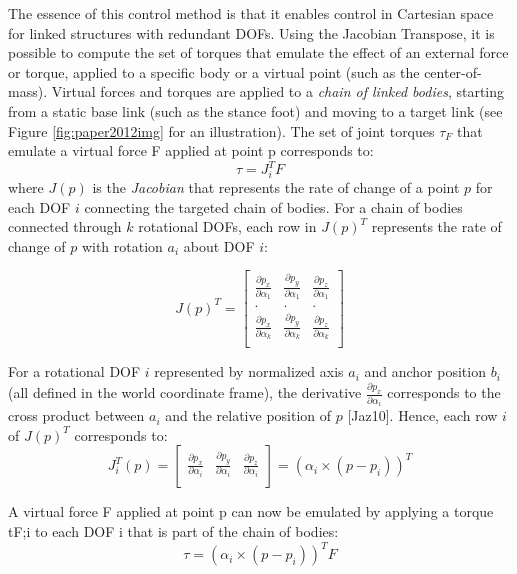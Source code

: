 \documentclass[runningheads,a4paper,10pt]{llncs}
\begin{document}
The essence of this control method is that it enables control in Cartesian space for linked structures with redundant DOFs. Using the Jacobian Transpose, it is possible to compute the set of torques that emulate the effect of an external force or torque, applied to a specific body or a virtual point (such as the center-of-mass). Virtual forces and torques are applied to a \textit{chain of linked bodies}, starting from a static base link (such as the stance foot) and moving to a target link (see Figure \ref{fig:paper2012img} for an illustration). The set of joint torques $\tau _F$ that emulate a virtual force F applied at point p corresponds to:
\begin{equation}
\tau=J_i^T F
\end{equation}
where $J(p)$ is the \textit{Jacobian} that represents the rate of change of a point $p$ for each DOF $i$ connecting the targeted chain of bodies. For a chain of bodies connected through $k$ rotational DOFs, each row in $J(p)^T$ represents the rate of change of $p$ with rotation $a_i$ about DOF $i$:

\begin{equation}
J(p)^T =\begin{bmatrix}
\frac{\partial p_x}{\partial \alpha_1} & \frac{\partial p_y}{\partial \alpha_1} & \frac{\partial p_z}{\partial \alpha_1} \\
. & . & . \\
\frac{\partial p_x}{\partial \alpha_k} & \frac{\partial p_y}{\partial \alpha_k} & \frac{\partial p_z}{\partial \alpha_k} \\
\end{bmatrix}
\end{equation}


For a rotational DOF $i$ represented by normalized axis $a_i$ and anchor position $b_i$ (all defined in the world coordinate frame), the derivative $\frac{\partial p_x}{\partial \alpha_i}$ corresponds to the cross product between $a_i$ and the relative position of $p$ [Jaz10]. Hence, each row $i$ of $J(p)^T$ corresponds to:
\begin{equation}
J_i ^T (p)=\begin{bmatrix}
\frac{\partial p_x}{\partial \alpha_i} & \frac{\partial p_y}{\partial \alpha_i} & \frac{\partial p_z}{\partial \alpha_i} \\
\end{bmatrix}
= (\alpha_i \times (p-p_i))^T
\end{equation}

A virtual force F applied at point p can now be emulated by applying a torque tF;i to each DOF i that is part of the chain of bodies:
\begin{equation}
\tau = (\alpha_i \times (p-p_i))^T F
\end{equation}
\end{document}
